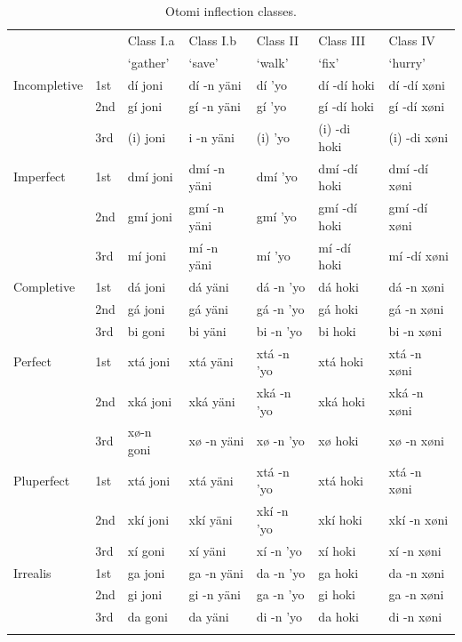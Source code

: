 \begin{table}[!htpb]
    \centering
    \footnotesize
  \begin{tabular}{lllllll}
    \lsptoprule
                 &     & Class I.a & Class I.b       & Class II     & Class III      & Class IV      \\
                 &     & `gather'  & `save'          & `walk'       & `fix'          & `hurry'       \\
    \midrule
    Incompletive & 1st & dí joni   & dí -n yäni      & dí 	’yo & dí -dí hoki    & dí -dí xøni   \\
                 & 2nd & gí joni   & gí -n yäni      & gí 	’yo & gí -dí hoki    & gí -dí xøni   \\
                 & 3rd & (i) joni  & i -n yäni       & (i) 	’yo & (i) -di hoki   & (i) -di xøni  \\
    \midrule
    Imperfect    & 1st & dmí joni  & dmí -n yäni     & dmí 	’yo & dmí -dí hoki   & dmí -dí xøni  \\
                 & 2nd & gmí joni  & gmí -n yäni     & gmí 	’yo & gmí -dí hoki   & gmí -dí xøni  \\
                 & 3rd & mí joni   & mí -n yäni      & mí 	’yo & mí -dí hoki    & mí -dí xøni   \\
    \midrule
    Completive   & 1st & dá joni   & dá 	yäni & dá -n ’yo    & dá 	hoki & dá -n xøni    \\
                 & 2nd & gá joni   & gá 	yäni & gá -n ’yo    & gá 	hoki & gá -n xøni    \\
                 & 3rd & bi goni   & bi 	yäni & bi -n ’yo    & bi 	hoki & bi -n xøni    \\
    \midrule
    Perfect      & 1st & xtá joni  & xtá 	yäni & xtá -n ’yo   & xtá 	hoki & xtá -n xøni   \\
                 & 2nd & xká joni  & xká 	yäni & xká -n ’yo   & xká 	hoki & xká -n xøni   \\
                 & 3rd & xø-n goni & xø -n yäni      & xø -n ’yo    & xø 	hoki & xø -n xøni    \\
    \midrule
    Pluperfect   & 1st & xtá joni  & xtá 	yäni & xtá -n ’yo   & xtá 	hoki & xtá -n xøni   \\
                 & 2nd & xkí joni  & xkí 	yäni & xkí -n ’yo   & xkí 	hoki & xkí -n xøni   \\
                 & 3rd & xí goni   & xí 	yäni & xí -n ’yo    & xí 	hoki & xí -n xøni    \\
    \midrule
    Irrealis     & 1st & ga joni   & ga -n yäni      & da -n ’yo    & ga 	hoki & da -n xøni    \\
                 & 2nd & gi joni   & gi -n yäni      & ga -n ’yo    & gi 	hoki & ga -n xøni    \\
                 & 3rd & da goni   & da 	yäni & di -n ’yo    & da 	hoki & di -n 	xøni \\
    \lspbottomrule
  \end{tabular}
  \caption{Otomi inflection classes.}\label{tab:class-otomi}
\end{table}

